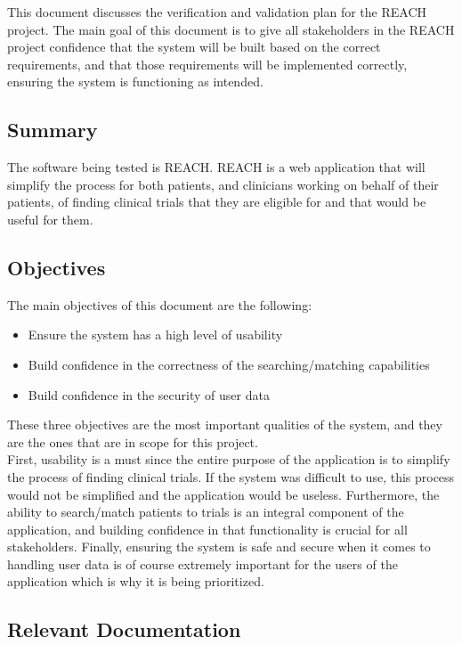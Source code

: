 \documentclass[12pt, titlepage]{article}
\begin{document}
This document discusses the verification and validation plan for the REACH project. The main goal of this document
is to give all stakeholders in the REACH project confidence that the system will be built based on the correct 
requirements, and that those requirements will be implemented correctly, ensuring the system is functioning as intended.

\subsection{Summary}

The software being tested is REACH. REACH is a web application that will simplify the process for both patients, and clinicians working 
on behalf of their patients, of finding clinical trials that they are eligible for and that would be useful for them.

\subsection{Objectives}

The main objectives of this document are the following:

\begin{itemize}
  \item Ensure the system has a high level of usability
  \item Build confidence in the correctness of the searching/matching capabilities
  \item Build confidence in the security of user data
\end{itemize}

These three objectives are the most important qualities of the system, and they are the ones that are in scope for this project. \\

First, usability is a must
since the entire purpose of the application is to simplify the process of finding clinical trials. If the system was difficult to use, this process 
would not be simplified and the application would be useless. 
Furthermore, the ability to search/match patients to trials is an integral component of the application, and building confidence in 
that functionality is crucial for all stakeholders. Finally, ensuring the system is safe and secure when it comes to handling user data is of course 
extremely important for the users of the application which is why it is being prioritized.

\subsection{Relevant Documentation}
\end{document}
